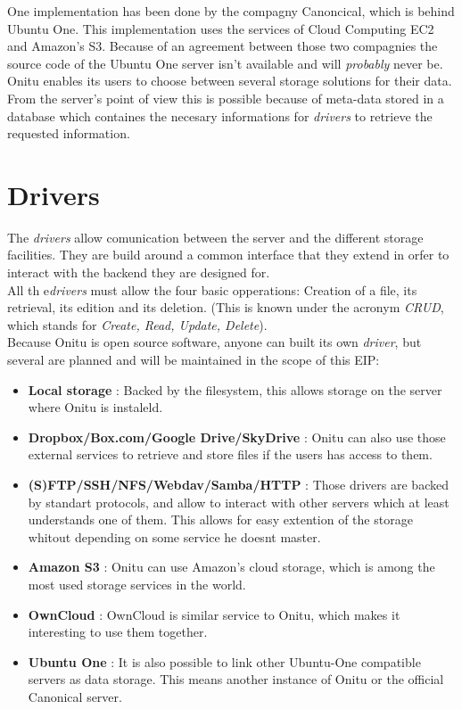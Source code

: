 One implementation has been done by the compagny Canoncical, which is behind Ubuntu One. This implementation uses the services of Cloud Computing EC2 and Amazon's S3. Because of an agreement between those two compagnies the source code of the Ubuntu One server isn't available and will \textit{probably} never be.\\

Onitu enables its users to choose between several storage solutions for their data. From the server's point of view this is possible because of meta-data stored in a database which containes the necesary informations for \textit{drivers} to retrieve the requested information.\\

\section{Drivers}
The \textit{drivers} allow comunication between the server and the different storage facilities. They are build around a common interface that they extend in orfer to interact with the backend they are designed for.\\

All th e\textit{drivers} must allow the four basic opperations: Creation of a file, its retrieval, its edition and its deletion. (This is known under the acronym \textit{CRUD}, which stands for \textit{Create, Read, Update, Delete}).\\

Because Onitu is open source software, anyone can built its own \textit{driver}, but several are planned and will be maintained in the scope of this EIP:
\begin{itemize}
\renewcommand{\labelitemi}{$\bullet$}
    \item \textbf{Local storage} : Backed by the filesystem, this allows storage on the server where Onitu is instaleld.
    \item \textbf{Dropbox/Box.com/Google Drive/SkyDrive} : Onitu can also use those external services to retrieve and store files if the users has access to them.
    \item \textbf{(S)FTP/SSH/NFS/Webdav/Samba/HTTP} : Those drivers are backed by standart protocols, and allow to interact with other servers which at least understands one of them. This allows for easy extention of the storage whitout depending on some service he doesnt master.
    \item \textbf{Amazon S3} : Onitu can use Amazon's cloud storage, which is among the most used storage services in the world.
    \item \textbf{OwnCloud} : OwnCloud is similar service to Onitu, which makes it interesting to use them together.
    \item \textbf{Ubuntu One} : It is also possible to link other Ubuntu-One compatible servers as data storage. This means another instance of Onitu or the official Canonical server.
\end{itemize}

